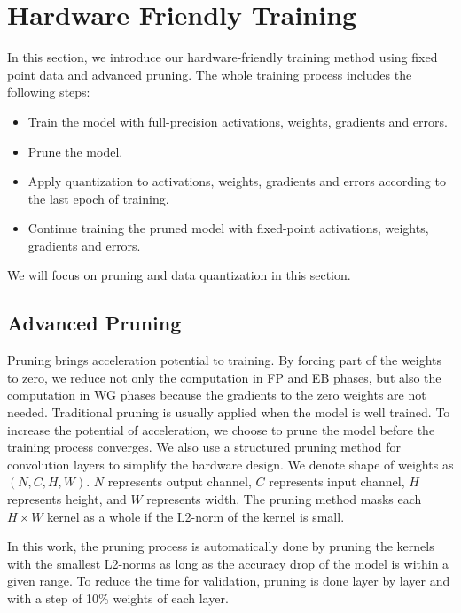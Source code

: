 \section{Hardware Friendly Training}\label{sec:training}
In this section, we introduce our hardware-friendly training method using fixed point data and advanced pruning. The whole training process includes the following steps:
\begin{itemize}
  \item Train the model with full-precision activations, weights, gradients and errors.
  \item Prune the model. 
  \item Apply quantization to activations, weights, gradients and errors according to the last epoch of training.  
  \item Continue training the pruned model with fixed-point activations, weights, gradients and errors.
\end{itemize}
We will focus on pruning and data quantization in this section.

\subsection{Advanced Pruning}\label{sec:training:prune}

Pruning brings acceleration potential to training. By forcing part of the weights to zero, we reduce not only the computation in FP and EB phases, but also the computation in WG phases because the gradients to the zero weights are not needed. Traditional pruning is usually applied when the model is well trained. To increase the potential of acceleration, we choose to prune the model before the training process converges. We also use a structured pruning method for convolution layers to simplify the hardware design. We denote shape of weights as $(N, C, H, W)$. $N$ represents output channel, $C$ represents input channel, $H$ represents height, and $W$ represents width. The pruning method masks each $H\times W$ kernel as a whole if the L2-norm of the kernel is small. 

In this work, the pruning process is automatically done by pruning the kernels with the smallest L2-norms as long as the accuracy drop of the model is within a given range. To reduce the time for validation, pruning is done layer by layer and with a step of 10\% weights of each layer.

